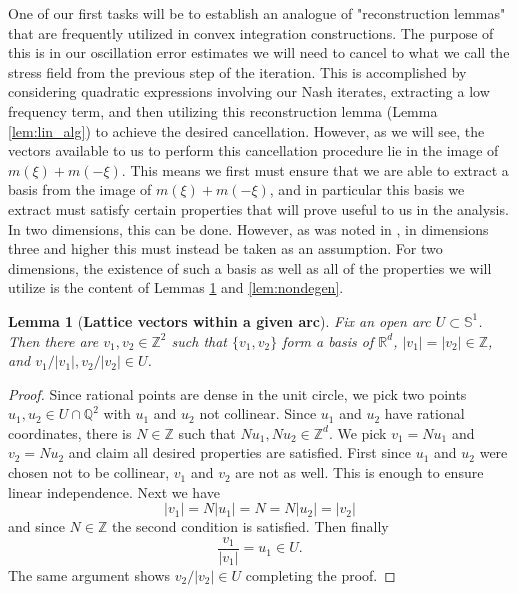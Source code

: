 \documentclass[12pt,reqno,letterpaper]{amsart}
\numberwithin{equation}{section}
\newcommand{\1}{{\bf 1}}
\newcommand{\2}{{\bf 2}}
\newcommand{\R}{\mathbb R}
\newcommand{\Q}{\mathbb Q}
\newcommand{\Z}{\mathbb Z}
\newtheorem{lemma}[theorem]{Lemma}
\theoremstyle{remark}
\theoremstyle{remark}
\begin{document}
One of our first tasks will be to establish an analogue of "reconstruction lemmas" that are frequently utilized in convex integration constructions. The purpose of this is in our oscillation error estimates we will need to cancel to what we call the stress field from the previous step of the iteration. This is accomplished by considering quadratic expressions involving our Nash iterates, extracting a low frequency term, and then utilizing this reconstruction lemma (Lemma \ref{lem:lin_alg}) to achieve the desired cancellation. However, as we will see, the vectors available to us to perform this cancellation procedure lie in the image of $m(\xi) + m(-\xi)$. This means we first must ensure that we are able to extract a basis from the image of $m(\xi) + m(-\xi)$, and in particular this basis we extract must satisfy certain properties that will prove useful to us in the analysis. In two dimensions, this can be done. However, as was noted in \cite{IV}, in dimensions three and higher this must instead be taken as an assumption. For two dimensions, the existence of such a basis as well as all of the properties we will utilize is the content of Lemmas \ref{lem:NT} and \ref{lem:nondegen}.

\begin{lemma}[\textbf{Lattice vectors within a given arc}]\label{lem:NT}
Fix an open arc $U \subset \mathbb{S}^1$. Then there are $v_1,v_2 \in \Z^2$ such that $\{v_1,v_2\}$ form a basis of $\R^d$, $|v_1| = |v_2| \in \Z$, and $v_1/|v_1|, v_2/|v_2| \in U$.
\end{lemma}
\begin{proof}
Since rational points are dense in the unit circle, we pick two points $u_1,u_2 \in U \cap \Q^2$ with $u_1$ and $u_2$ not collinear. Since $u_1$ and $u_2$ have rational coordinates, there is $N \in \Z$ such that $Nu_1,Nu_2 \in \Z^d$. We pick $v_1 = Nu_1$ and $v_2 = Nu_2$ and claim all desired properties are satisfied. First since $u_1$ and $u_2$ were chosen not to be collinear, $v_1$ and $v_2$ are not as well. This is enough to ensure linear independence. Next we have
$$
|v_1| = N|u_1| = N = N|u_2| = |v_2|
$$
and since $N \in \Z$ the second condition is satisfied. Then finally
$$
\frac{v_1}{|v_1|} = u_1 \in U.
$$
The same argument shows $v_2/|v_2| \in U$ completing the proof.
\end{proof}
\end{document}
